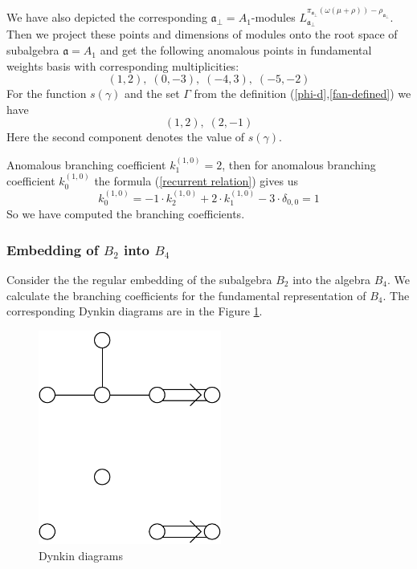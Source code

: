 \documentclass[a4paper,12pt]{article}
\theoremstyle{definition} \newtheorem{Def}{Definition}
\begin{document}
We have also depicted the corresponding $\mathfrak{a}_{\bot}=A_1$-modules $L^{\pi_{\mathfrak{a}_{\bot}}(\omega(\mu+\rho))-\rho_{\mathfrak{a}_{\bot}}}_{\mathfrak{a}_{\bot}}$.
Then we project these points and dimensions of modules onto the root space of subalgebra $\mathfrak{a}=A_1$ and get the following anomalous points in fundamental weights basis with corresponding multiplicities:
\begin{equation}
  \label{eq:25}
  (1,2),\; (0,-3),\; (-4,3),\; (-5,-2)
\end{equation}
For the function $s(\gamma)$ and the set $\Gamma$ from the definition (\ref{phi-d},\ref{fan-defined}) we have
\begin{equation}
  \label{eq:22}
  (1,2),\; (2,-1)
\end{equation}
Here the second component denotes the value of $s(\gamma)$.

Anomalous branching coefficient $k^{(1,0)}_{1}=2$, then for anomalous branching coefficient $k^{(1,0)}_{0}$ the formula (\ref{recurrent relation}) gives us
\begin{equation}
  \label{eq:23}
  k^{(1,0)}_{0}=-1\cdot k^{(1,0)}_2 +2\cdot k^{(1,0)}_1 - 3\cdot \delta_{0,0} = 1
\end{equation}
So we have computed the branching coefficients.

\subsubsection{Embedding of $B_2$ into $B_4$}
\label{sec:someth-high-dimens}
Consider the the regular embedding of the subalgebra $B_2$ into the algebra $B_4$.
We calculate the branching coefficients for the fundamental representation of $B_4$.
The corresponding Dynkin diagrams are in the Figure \ref{fig:dynkin}.
\begin{figure}[ph]
  \centering
  \includegraphics[width=60mm]{B4_B2_2A1.pdf}
  \caption{Dynkin diagrams}
  \label{fig:dynkin}
\end{figure}
\end{document}
